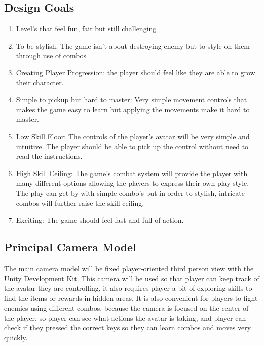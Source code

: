 \documentclass{article}
\begin{document}
\subsection*{Design Goals}
    \begin{enumerate}
        \item Level's that feel fun, fair but still challenging
        \item To be stylish. The game isn't about destroying enemy but to style on them through use of combos
        \item Creating Player Progression: the player should feel like they are able to grow their character. 
        \item Simple to pickup but hard to master:  Very simple movement controls that makes the game easy to learn but applying the movements make it hard to master.
        \item Low Skill Floor: The controls of the player's avatar will be very simple and intuitive. The player should be able to pick up the control without need to read the instructions.
        \item High Skill Ceiling: The game's combat system will provide the player with many different options allowing the players to express their own play-style. The play can get by with simple combo's but in order to stylish, intricate combos will further raise the skill ceiling.
        \item Exciting: The game should feel fast and full of action.
    \end{enumerate}



    
\subsection*{Principal Camera Model}
The main camera model will be fixed player-oriented third person view with the Unity Development Kit. This camera will be used so that player can keep track of the avatar they are controlling, it also requires player a bit of exploring skills to find the items or rewards in hidden areas. It is also convenient for players to fight enemies using different combos, because the camera is focused on the center of the player, so player can see what actions the avatar is taking, and player can check if they pressed the correct keys so they can learn combos and moves very quickly.
\end{document}
